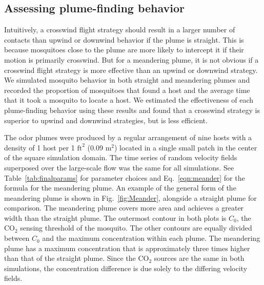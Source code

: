 \documentclass[10pt]{article}
\begin{document}
		\subsection*{Assessing plume-finding behavior}\label{sec:res:meander}
			Intuitively, a crosswind flight strategy should result in a larger number of contacts than upwind or downwind behavior if the plume is straight. This is because mosquitoes close to the plume are more likely to intercept it if their motion is primarily crosswind. But for a meandering plume, it is not obvious if a crosswind flight strategy is more effective than an upwind or downwind strategy. We simulated mosquito behavior in both straight and meandering plumes and recorded the proportion of mosquitoes that found a host and the average time that it took a mosquito to locate a host. We estimated the effectiveness of each plume-finding behavior using these results and found that a crosswind strategy is superior to upwind and downwind strategies, but is less efficient.
			
			
			The odor plumes were produced by a regular arrangement of nine hosts with a density of 1 host per 1 $\mbox{ft}^2$ (0.09 $\mbox{m}^2$) located in a single small patch in the center of the square simulation domain. The time series of random velocity fields superposed over the large-scale flow was the same for all simulations. See Table~\ref{tab:finalparams} for parameter choices and Eq.~\eqref{eqn:meander} for the formula for the meandering plume. An example of the general form of the meandering plume is shown in Fig.~\ref{fig:Meander}, alongside a straight plume for comparison. The meandering plume covers more area and achieves a greater width than the straight plume. The outermost contour in both plots is $C_0$, the $\mbox{CO}_2$ sensing threshold of the mosquito. The other contours are equally divided between $C_0$ and the maximum concentration within each plume. The meandering plume has a maximum concentration that is approximately three times higher than that of the straight plume. Since the $\mbox{CO}_2$ sources are the same in both simulations, the concentration difference is due solely to the differing velocity fields.
\end{document}
